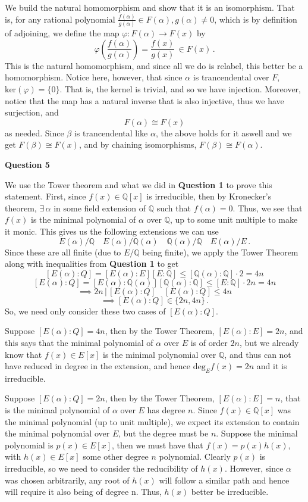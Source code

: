 \documentclass[10pt]{article}
\newcommand{\Q}{\mathbb{Q}}
\begin{document}
We build the natural homomorphism and show that it is an isomorphism. That is, for any rational polynomial $\frac{f(\alpha)}{g(\alpha)}\in F(\alpha), g(\alpha) \neq 0$, which is by definition of adjoining, we define the map $\varphi: F(\alpha) \to F(x)$ by
\[ \varphi\left(\frac{f(\alpha)}{g(\alpha)}\right) = \frac{f(x)}{g(x)} \, \in F(x) \, .\]
This is the natural homomorphism, and since all we do is relabel, this better be a homomorphism. Notice here, however, that since $\alpha$ is trancendental over $F$, $\text{ker}(\varphi) = \{0\}$. That is, the kernel is trivial, and so we have injection. Moreover, notice that the map has a natural inverse that is also injective, thus we have surjection, and 
\[ F(\alpha) \cong F(x) \]
as needed. Since $\beta$ is trancendental like $\alpha$, the above holds for it aswell and we get $F(\beta) \cong F(x)$, and by chaining isomorphisms, $F(\beta) \cong F(\alpha)$.

\newpage
\textbf{Question 5}

We use the Tower theorem and what we did in \textbf{Question 1} to prove this statement. First, since $f(x) \in \Q[x]$ is irreducible, then by Kronecker's theorem, $\exists \, \alpha$ in some field extension of $\Q$ such that $f(\alpha) = 0$. Thus, we see that $f(x)$ is the minimal polynomial of $\alpha$ over $\Q$, up to some unit multiple to make it monic. This gives us the following extensions we can use
\[ E(\alpha)/\Q \quad E(\alpha)/\Q(\alpha) \quad \Q(\alpha)/\Q \quad E(\alpha)/E \, .\]
Since these are all finite (due to $E/\Q$ being finite), we apply the Tower Theorem along with inequalities from \textbf{Question 1} to get
\[ [E(\alpha):Q] = [E(\alpha):E][E:\Q] \leq [\Q(\alpha):\Q]\cdot 2 = 4n \]
\[ [E(\alpha):Q] = [E(\alpha):\Q(\alpha)][\Q(\alpha):\Q] \leq [E:\Q]\cdot 2n = 4n \]
\[ \implies 2n\, | \, [E(\alpha):Q] \quad [E(\alpha):Q] \leq 4n\]
\[ \implies [E(\alpha):Q] \in \{2n, 4n\} \, .\]
So, we need only consider these two cases of $[E(\alpha):Q]$.

Suppose $[E(\alpha):Q] = 4n$, then by the Tower Theorem, $[E(\alpha):E] = 2n$, and this says that the minimal polynomial of $\alpha$ over $E$ is of order $2n$, but we already know that $f(x)\in E[x]$ is the minimal polynomial over $\Q$, and thus can not have reduced in degree in the extension, and hence $\text{deg}_{E}f(x) = 2n$ and it is irreducible.

Suppose $[E(\alpha):Q] = 2n$, then by the Tower Theorem, $[E(\alpha):E] = n$, that is the minimal polynomial of $\alpha$ over $E$ has degree $n$. Since $f(x) \in \Q[x]$ was the minimal polynomial (up to unit multiple), we expect its extension to contain the minimal polynomial over $E$, but the degree must be $n$. Suppose the minimal polynomial is $p(x)\in E[x]$, then we must have that $f(x) = p(x)h(x)$, with $h(x)\in E[x]$ some other degree $n$ polynomial. Clearly $p(x)$ is irreducible, so we need to consider the reducibility of $h(x)$. However, since $\alpha$ was chosen arbitrarily, any root of $h(x)$ will follow a similar path and hence will require it also being of degree n. Thus, $h(x)$ better be irreducible.
\end{document}

